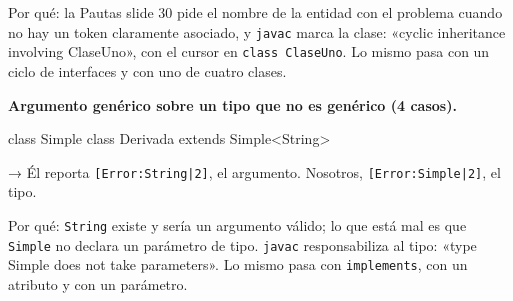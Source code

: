 \documentclass[12pt,a4paper]{article}
\newcommand{\cod}[1]{\texttt{#1}}
\newcommand{\pregunta}[1]{\par\medskip\needspace{4\baselineskip}\noindent\textbf{#1}\par\smallskip}
\begin{document}
Por qué: la Pautas slide 30 pide el nombre de la entidad con el problema cuando no hay un token
claramente asociado, y \cod{javac} marca la clase: «cyclic inheritance involving ClaseUno», con el
cursor en \cod{class ClaseUno}. Lo mismo pasa con un ciclo de interfaces y con uno de cuatro clases.

\pregunta{Argumento genérico sobre un tipo que no es genérico (4 casos).}

\begin{fuente}
class Simple { }
class Derivada extends Simple<String> { }
\end{fuente}

→ Él reporta \cod{[Error:String|2]}, el argumento. Nosotros, \cod{[Error:Simple|2]}, el tipo.

Por qué: \cod{String} existe y sería un argumento válido; lo que está mal es que \cod{Simple} no
declara un parámetro de tipo. \cod{javac} responsabiliza al tipo: «type Simple does not take
parameters». Lo mismo pasa con \cod{implements}, con un atributo y con un parámetro.
\end{document}

